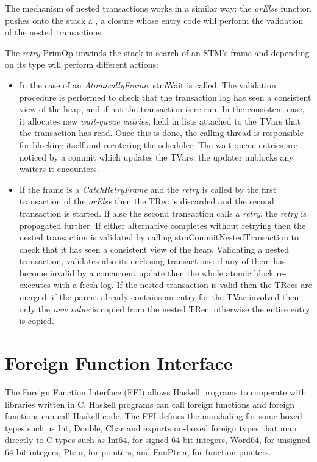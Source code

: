 The mechanism of nested transactions works in a similar way: the \emph{orElse} function pushes onto the stack a , a closure whose entry code will perform the validation of the nested transactions.

The \emph{retry} PrimOp unwinds the stack in search of an STM's frame and depending on its type will perform different actions:
\begin{itemize}
\item
In the case of an \emph{AtomicallyFrame}, stmWait is called.
The validation procedure is performed to check that the transaction log has seen a consistent view of the heap, and if not the transaction is re-run.
In the consistent case, it allocates new \emph{wait-queue entries}, held in  lists attached to the TVars that the transaction has read. 
Once this is done, the calling thread is responsible for blocking itself and reentering the scheduler. The wait queue entries are noticed by a commit which updates the TVars: the updater unblocks any waiters it encounters.
\item
If the frame is a \emph{CatchRetryFrame} and the \emph{retry} is called by the first transaction of the \emph{orElse} then the TRec is discarded and the second transaction is started. If also the second transaction calls a \emph{retry}, the \emph{retry} is propagated further.
If either alternative completes without retrying then the nested transaction is validated by calling stmCommitNestedTransaction to check that it has seen a consistent view of the heap. Validating a nested transaction, validates also its enclosing transactions: if any of them has become invalid by a concurrent update then the whole atomic block re-executes with a fresh log.  If the nested transaction is valid then the TRecs are merged: if the parent already contains an entry for the TVar involved then only the \emph{new value} is copied from the nested TRec, otherwise the entire entry is copied.
\end{itemize}

\section{Foreign Function Interface}

The Foreign Function Interface (FFI) allows Haskell programs to cooperate with libraries written in C.
Haskell programs can call foreign functions and foreign functions can call Haskell code.
The FFI defines the marshaling for some boxed types such us Int, Double, Char and exports un-boxed foreign types that map directly to C types such as Int64, for signed 64-bit integers, Word64, for unsigned 64-bit integers, Ptr a, for pointers, and FunPtr a, for function pointers.

